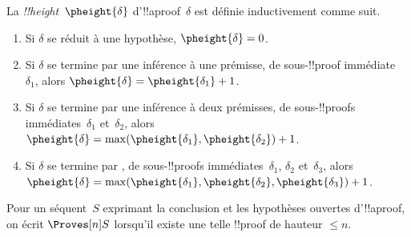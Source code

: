 \documentclass[../../../include/open-logic-section]{subfiles}
\begin{document}


\begin{defn}
La \emph{!!{height}}~$\pheight{\delta}$ d'!!a{proof}~$\delta$
est définie inductivement comme suit.
\begin{enumerate}
  \item Si $\delta$ se réduit à une hypothèse,
  $\pheight{\delta} = 0$.
  \item Si $\delta$ se termine par une inférence à une
  prémisse, de sous-!!{proof} immédiate~$\delta_1$, alors
  $\pheight{\delta} = \pheight{\delta_1} + 1$.
  \item Si $\delta$ se termine par une inférence à deux
  prémisses, de sous-!!{proof}s immédiates~$\delta_1$
  et~$\delta_2$, alors $\pheight{\delta} =
  \max(\pheight{\delta_1}, \pheight{\delta_2}) + 1$.
  \item Si $\delta$ se termine par \Elim{\lor}, de
  sous-!!{proof}s immédiates~$\delta_1$, $\delta_2$
  et~$\delta_3$, alors $\pheight{\delta} =
  \max(\pheight{\delta_1}, \pheight{\delta_2}, \pheight{\delta_3}) + 1$.
\end{enumerate}
Pour un séquent~$S$ exprimant la conclusion et les hypothèses
ouvertes d'!!a{proof}, on écrit $\Proves[n] S$ lorsqu'il
existe une telle !!{proof} de hauteur $\le n$.
\end{defn}
\end{document}
